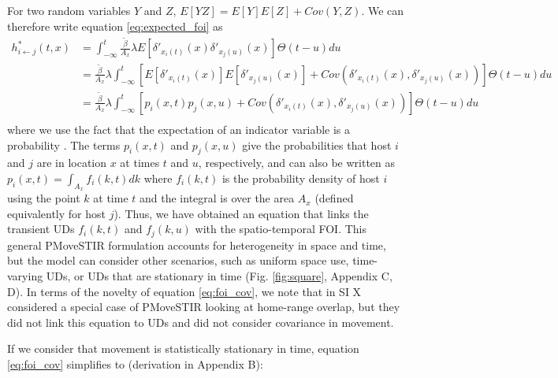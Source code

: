 \documentclass[letterpaper]{article}
\begin{document}
For two random variables $Y$ and $Z$, $E[YZ] = E[Y]E[Z] + Cov(Y, Z)$.  We can therefore write equation \ref{eq:expected_foi} as
\begin{equation}
    \begin{aligned}
        h^*_{i \leftarrow j}(t, x) &= \int_{-\infty}^{t} \frac{\tilde{\beta}}{A_x} \lambda E[\delta'_{x_i(t)}(x) \delta'_{x_j(u)}(x)] \Theta(t - u) du \\
        &= \frac{\tilde{\beta}}{A_x} \lambda \int_{-\infty}^{t} [E[\delta'_{x_i(t)}(x)] E[\delta'_{x_j(u)}(x)] + Cov(\delta'_{x_i(t)}(x), \delta'_{x_j(u)}(x))] \Theta(t - u) du \\
        &= \frac{\tilde{\beta}}{A_x} \lambda \int_{-\infty}^{t} [p_i(x, t) p_j(x, u) + Cov(\delta'_{x_i(t)}(x), \delta'_{x_j(u)}(x))] \Theta(t - u) du \\
    \end{aligned}
    \label{eq:foi_cov}
\end{equation}
where we use the fact that the expectation of an indicator variable is a probability \citep{Grimmett2001}. The terms $p_i(x, t)$ and $p_j(x,u)$ give the probabilities that host $i$ and $j$ are in location $x$ at times $t$ and $u$, respectively, and can also be written as $p_i(x, t) = \int_{A_x} f_i(k, t) dk$ where $f_i(k, t)$ is the probability density of host $i$ using the point $k$ at time $t$ and the integral is over the area $A_x$ (defined equivalently for host $j$). Thus, we have obtained an equation that links the transient UDs $f_i(k, t)$ and $f_j(k, u)$ with the spatio-temporal FOI.
This general PMoveSTIR formulation accounts for heterogeneity in space and time, but the model can consider other scenarios, such as uniform space use, time-varying UDs, or UDs that are stationary in time (Fig. \ref{fig:square}, Appendix C, D).  In terms of the novelty of equation \ref{eq:foi_cov}, we note that \cite{Wilber2022} in SI X considered a special case of PMoveSTIR looking at home-range overlap, but they did not link this equation to UDs and did not consider covariance in movement.

If we consider that movement is statistically stationary in time, equation \ref{eq:foi_cov} simplifies to (derivation in Appendix B):
\end{document}
